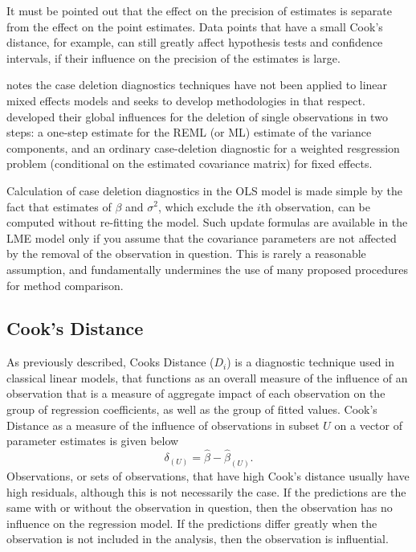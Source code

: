 \documentclass[12pt, a4paper]{report}
\theoremstyle{plain}
\theoremstyle{definition}
\theoremstyle{remark}
\begin{document}
	
	
	It must be pointed out that the effect on the precision of estimates is separate from the effect on the point estimates. Data points that have a small Cook's distance, for example, can still greatly affect hypothesis tests and confidence intervals, if their 
	influence on the precision of the estimates is large.	
	
	\citet{Christensen} notes the case deletion diagnostics techniques have not been applied to linear mixed effects models and seeks to develop methodologies in that respect. \citet{Christensen} developed their global influences for the deletion of single observations in two steps: a one-step estimate for the REML (or ML) estimate of the variance components, and an ordinary case-deletion diagnostic for a weighted resgression problem (conditional on the estimated covariance matrix) for fixed effects.
	
Calculation of case deletion diagnostics in the OLS model is made simple by the fact that estimates of $\beta$ and $\sigma^2$, which exclude the $i$th observation, can be computed without re-fitting the model. Such update formulas are available in the LME model only if you assume that the covariance parameters are not affected by the removal of the observation in question. This is rarely a reasonable assumption, and fundamentally undermines the use of many proposed procedures for method comparison.
	
\subsection{Cook's Distance}
As previously described,  Cooks Distance ($D_{i}$) is a diagnostic technique used in classical linear models, that functions as an overall measure of the influence of an observation that is a measure of aggregate impact of each observation on the group of regression coefficients, as well as the group of fitted values.  Cook's Distance as a measure of the influence of observations in subset $U$ on a vector of parameter estimates is given below \citep{cook77}
\[ \delta_{(U)} = \hat{\beta} - \hat{\beta}_{(U)}.\]
Observations, or sets of observations, that have high Cook's distance usually have high residuals, although this is not necessarily the case.
If the predictions are the same with or without the observation in question, then the observation has no influence on the regression model. If the predictions differ greatly when the observation is not included in the analysis, then the observation is influential.
\end{document}
